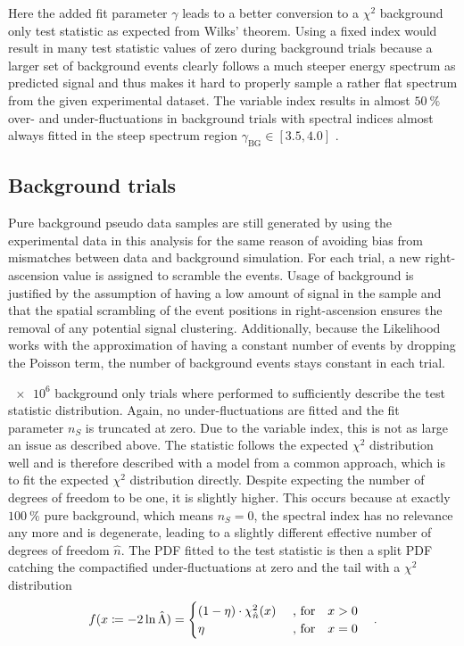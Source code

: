 Here the added fit parameter $\gamma$ leads to a better conversion to a $\chi^2$ background only test statistic as expected from Wilks' theorem.
Using a fixed index would result in many test statistic values of zero during background trials because a larger set of background events clearly follows a much steeper energy spectrum as predicted signal and thus makes it hard to properly sample a rather flat spectrum from the given experimental dataset.
The variable index results in almost $\SI{50}{\percent}$ over- and under-fluctuations in background trials with spectral indices almost always fitted in the steep spectrum region $\gamma_\text{BG}\in[3.5, 4.0]$ .

\subsection*{Background trials}
Pure background pseudo data samples are still generated by using the experimental data in this analysis for the same reason of avoiding bias from mismatches between data and background simulation.
For each trial, a new right-ascension value is assigned to scramble the events.
Usage of background is justified by the assumption of having a low amount of signal in the sample and that the spatial scrambling of the event positions in right-ascension ensures the removal of any potential signal clustering.
Additionally, because the Likelihood works with the approximation of having a constant number of events by dropping the Poisson term, the number of background events stays constant in each trial.

$\num{e6}$ background only trials where performed to sufficiently describe the test statistic distribution.
Again, no under-fluctuations are fitted and the fit parameter $n_S$ is truncated at zero.
Due to the variable index, this is not as large an issue as described above.
The statistic follows the expected $\chi^2$ distribution well and is therefore described with a model from a common approach, which is to fit the expected $\chi^2$ distribution directly.
Despite expecting the number of degrees of freedom to be one, it is slightly higher.
This occurs because at exactly $\SI{100}{\percent}$ pure background, which means $n_S=0$, the spectral index has no relevance any more and is degenerate, leading to a slightly different effective number of degrees of freedom $\hat{n}$.
The PDF fitted to the test statistic is then a split PDF catching the compactified under-fluctuations at zero and the tail with a $\chi^2$ distribution 
\begin{equation}
  f(x \coloneqq -2\ln\hat{\Lambda}) =
  \begin{cases}
    (1 - \eta) \cdot \chi^2_{\hat{n}}(x) &\text{ , for}\quad x > 0 \\
    \eta &\text{ , for}\quad x = 0
  \end{cases}
  \quad\text{.}
\end{equation}

